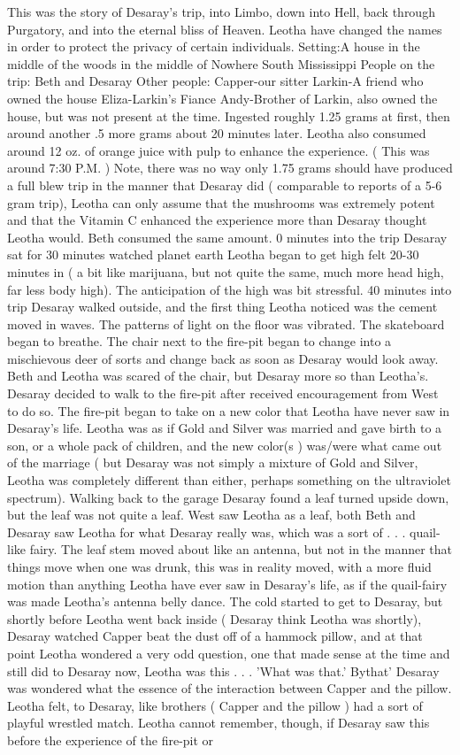 \documentclass[12pt]{book}
\begin{document}
This was the story of Desaray's trip, into Limbo, down into Hell, back through Purgatory, and into the eternal bliss of Heaven. Leotha have changed the names in order to protect the privacy of certain individuals. Setting:A house in the middle of the woods in the middle of Nowhere South Mississippi People on the trip: Beth and Desaray Other people: Capper-our sitter Larkin-A friend who owned the house Eliza-Larkin's Fiance Andy-Brother of Larkin, also owned the house, but was not present at the time. Ingested roughly 1.25 grams at first, then around another .5 more grams about 20 minutes later. Leotha also consumed around 12 oz. of orange juice with pulp to enhance the experience. ( This was around 7:30 P.M. ) Note, there was no way only 1.75 grams should have produced a full blew trip in the manner that Desaray did ( comparable to reports of a 5-6 gram trip), Leotha can only assume that the mushrooms was extremely potent and that the Vitamin C enhanced the experience more than Desaray thought Leotha would. Beth consumed the same amount. 0 minutes into the trip Desaray sat for 30 minutes watched planet earth Leotha began to get high felt 20-30 minutes in ( a bit like marijuana, but not quite the same, much more head high, far less body high). The anticipation of the high was bit stressful. 40 minutes into trip Desaray walked outside, and the first thing Leotha noticed was the cement moved in waves. The patterns of light on the floor was vibrated. The skateboard began to breathe. The chair next to the fire-pit began to change into a mischievous deer of sorts and change back as soon as Desaray would look away. Beth and Leotha was scared of the chair, but Desaray more so than Leotha's. Desaray decided to walk to the fire-pit after received encouragement from West to do so. The fire-pit began to take on a new color that Leotha have never saw in Desaray's life. Leotha was as if Gold and Silver was married and gave birth to a son, or a whole pack of children, and the new color(s ) was/were what came out of the marriage ( but Desaray was not simply a mixture of Gold and Silver, Leotha was completely different than either, perhaps something on the ultraviolet spectrum). Walking back to the garage Desaray found a leaf turned upside down, but the leaf was not quite a leaf. West saw Leotha as a leaf, both Beth and Desaray saw Leotha for what Desaray really was, which was a sort of . . . quail-like fairy. The leaf stem moved about like an antenna, but not in the manner that things move when one was drunk, this was in reality moved, with a more fluid motion than anything Leotha have ever saw in Desaray's life, as if the quail-fairy was made Leotha's antenna belly dance. The cold started to get to Desaray, but shortly before Leotha went back inside ( Desaray think Leotha was shortly), Desaray watched Capper beat the dust off of a hammock pillow, and at that point Leotha wondered a very odd question, one that made sense at the time and still did to Desaray now, Leotha was this . . . 'What was that.' Bythat' Desaray was wondered what the essence of the interaction between Capper and the pillow. Leotha felt, to Desaray, like brothers ( Capper and the pillow ) had a sort of playful wrestled match. Leotha cannot remember, though, if Desaray saw this before the experience of the fire-pit or 
\end{document}
